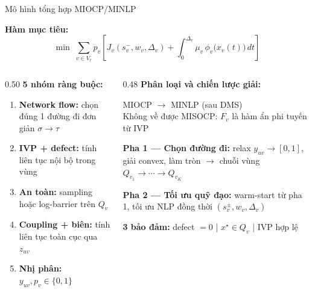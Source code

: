 \documentclass[aspectratio=169]{beamer}
\begin{document}
\begin{frame}{Mô hình tổng hợp MIOCP/MINLP}
    \footnotesize

    \textbf{Hàm mục tiêu:}
    \[
        \min\;\sum_{v\in V_r} p_v\!\left[
            J_v(s_v^-,w_v,\Delta_v)
            +\int_0^{\Delta_v}\!\mu_v\,\phi_v\!\bigl(x_v(t)\bigr)\,dt
            \right]
    \]

    \vspace{0.1em}

    \begin{columns}[T, onlytextwidth]
        \begin{column}{0.50\textwidth}
            \textbf{5 nhóm ràng buộc:}
            \begin{enumerate}
                \item \textbf{Network flow:} chọn đúng 1 đường đi đơn giản $\sigma\to\tau$
                \item \textbf{IVP + defect:} tính liên tục nội bộ trong vùng
                \item \textbf{An toàn:} sampling hoặc log-barrier trên $Q_v$
                \item \textbf{Coupling + biên:} tính liên tục toàn cục qua $z_{uv}$
                \item \textbf{Nhị phân:} $y_{uv},p_v\in\{0,1\}$
            \end{enumerate}
        \end{column}

        \begin{column}{0.48\textwidth}
            \textbf{Phân loại và chiến lược giải:}

            \vspace{0.2em}
            MIOCP $\to$ MINLP (sau DMS)\\
            Không về được MISOCP: $F_v$ là hàm ẩn phi tuyến từ IVP

            \vspace{0.4em}
            \textbf{Pha 1 — Chọn đường đi:}
            relax $y_{uv}\to[0,1]$, giải convex, làm tròn
            $\to$ chuỗi vùng $Q_{v_1}\!\to\!\cdots\!\to\! Q_{v_K}$

            \vspace{0.2em}
            \textbf{Pha 2 — Tối ưu quỹ đạo:}
            warm-start từ pha 1,
            tối ưu NLP đồng thời $(s_v^\pm,w_v,\Delta_v)$

            \vspace{0.3em}
            \textbf{3 bảo đảm:} defect $=0$ \;|\; $x^\star\!\in Q_v$ \;|\; IVP hợp lệ
        \end{column}
    \end{columns}

\end{frame}
\end{document}
